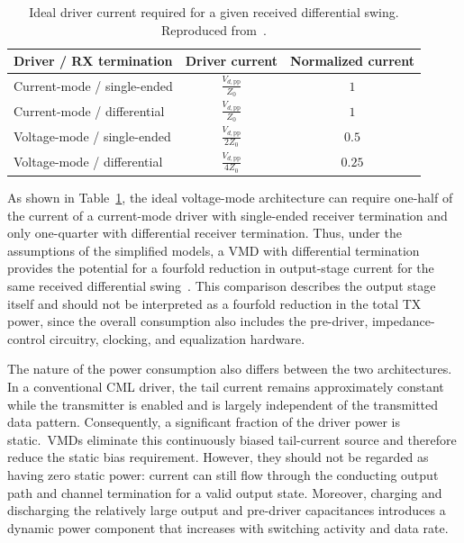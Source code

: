 \begin{table}[H]
    \centering
    \caption{Ideal driver current required for a given received differential swing. Reproduced from~\cite{palermo_ecen689_lec5}.}
    \label{tab:cm_vm_current_comparison}
    \begin{tabular}{lcc}
        \hline
        \textbf{Driver / RX termination} &
        \textbf{Driver current} &
        \textbf{Normalized current} \\
        \hline
        Current-mode / single-ended
        & $\displaystyle \frac{V_{d,\mathrm{pp}}}{Z_0}$
        & $1$ \\[6pt]

        Current-mode / differential
        & $\displaystyle \frac{V_{d,\mathrm{pp}}}{Z_0}$
        & $1$ \\[6pt]

        Voltage-mode / single-ended
        & $\displaystyle \frac{V_{d,\mathrm{pp}}}{2Z_0}$
        & $0.5$ \\[6pt]

        Voltage-mode / differential
        & $\displaystyle \frac{V_{d,\mathrm{pp}}}{4Z_0}$
        & $0.25$ \\
        \hline
    \end{tabular}
\end{table}

As shown in Table~\ref{tab:cm_vm_current_comparison}, the ideal voltage-mode architecture can require one-half of the current of a current-mode driver with single-ended receiver termination and only one-quarter with differential receiver termination. Thus, under the assumptions of the simplified models, a \ac{VMD} with differential termination provides the potential for a fourfold reduction in output-stage current for the same received differential swing~\cite{xiong_vmd_2020,dally_poulton_1998}. This comparison describes the output stage itself and should not be interpreted as a fourfold reduction in the total \ac{TX} power, since the overall consumption also includes the pre-driver, impedance-control circuitry, clocking, and equalization hardware.

The nature of the power consumption also differs between the two architectures. In a conventional \ac{CML} driver, the tail current remains approximately constant while the transmitter is enabled and is largely independent of the transmitted data pattern. Consequently, a significant fraction of the driver power is static.~\acsp{VMD} eliminate this continuously biased tail-current source and therefore reduce the static bias requirement. However, they should not be regarded as having zero static power: current can still flow through the conducting output path and channel termination for a valid output state. Moreover, charging and discharging the relatively large output and pre-driver capacitances introduces a dynamic power component that increases with switching activity and data rate.

